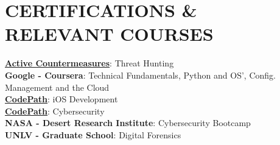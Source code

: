 \documentclass[letterpaper,11pt]{article}
\begin{document}
%
\section{CERTIFICATIONS \& RELEVANT COURSES  }
 \begin{itemize}[leftmargin=0.15in, label={}]
    \small{\item{
     \textbf{\href{https://activecountermeasures.com}{\underline{Active Countermeasures}}}{: Threat Hunting} \\
     \textbf{Google - Coursera}{: Technical Fundamentals, Python and OS', Config. Management and the Cloud} \\
     \textbf{\href{https://codepath.org}{\underline{CodePath}}}{: iOS  Development} \\
     \textbf{\href{https://codepath.org}{\underline{CodePath}}}{: Cybersecurity} \\
     \textbf{NASA - Desert Research Institute}{: Cybersecurity Bootcamp} \\
     \textbf{UNLV - Graduate School}{: Digital Forensics} \\
    }}
 \end{itemize}


\end{document}
